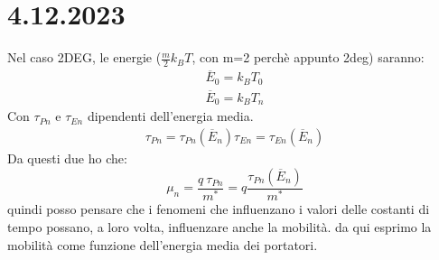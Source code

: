 \section{4.12.2023}
Nel caso 2DEG, le energie ($\frac{m}{2}k_BT$, con m=2 perchè appunto 2deg) saranno:
\begin{align*}
    \overline{E}_0=k_BT_0\\
    \overline{E}_0=k_BT_n    
\end{align*}
Con $\tau_{Pn} $ e $\tau_{En}$ dipendenti dell'energia media.
\begin{align*}
     \tau_{Pn} = \tau_{Pn}(\overline{E}_n)
     \tau_{En} = \tau_{En}(\overline{E}_n)
\end{align*}
Da questi due ho che:
\begin{equation}
    \mu_n=\dfrac{q\ \tau_{Pn}}{m^*}=q\dfrac{\tau_{Pn}(\overline{E}_n)}{m^*}
\end{equation}
quindi posso pensare che i fenomeni che influenzano i valori delle costanti di tempo possano, a loro volta, influenzare anche la mobilità. da qui esprimo la mobilità come funzione dell'energia media dei portatori.


